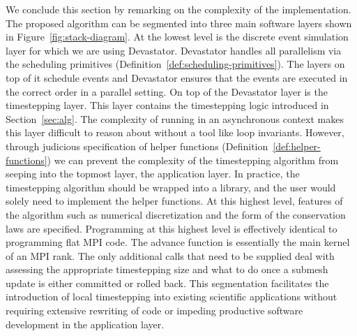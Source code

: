 We conclude this section by remarking on the complexity of the implementation. The proposed algorithm can be segmented into three main software layers shown in Figure~\ref{fig:stack-diagram}. At the lowest level is the discrete event simulation layer for which we are using Devastator. Devastator handles all parallelism via the scheduling primitives (Definition~\ref{def:scheduling-primitives}). The layers on top of it schedule events and Devastator ensures that the events are executed in the correct order in a parallel setting. On top of the Devastator layer is the timestepping layer. This layer contains the timestepping logic introduced in Section~\ref{sec:alg}. The complexity of running in an asynchronous context makes this layer difficult to reason about without a tool like loop invariants. However, through judicious specification of helper functions (Definition~\ref{def:helper-functions}) we can prevent the complexity of the timestepping algorithm from seeping into the topmost layer, the application layer. In practice, the timestepping algorithm should be wrapped into a library, and the user would solely need to implement the helper functions. At this highest level, features of the algorithm such as numerical discretization and the form of the conservation laws are specified. Programming at this highest level is effectively identical to programming flat MPI code. The {\sc advance} function is essentially the main kernel of an MPI rank. The only additional calls that need to be supplied deal with assessing the appropriate timestepping size and what to do once a submesh update is either committed or rolled back. This segmentation facilitates the introduction of local timestepping into existing scientific applications without requiring extensive rewriting of code or impeding productive software development in the application layer.